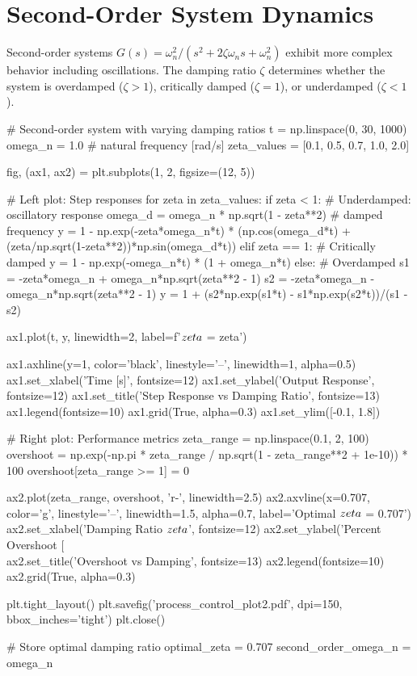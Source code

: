 \documentclass[11pt,a4paper]{article}
\begin{document}
\section{Second-Order System Dynamics}

Second-order systems $G(s) = \omega_n^2/(s^2 + 2\zeta\omega_n s + \omega_n^2)$ exhibit more complex behavior including oscillations. The damping ratio $\zeta$ determines whether the system is overdamped ($\zeta > 1$), critically damped ($\zeta = 1$), or underdamped ($\zeta < 1$).

\begin{pycode}
# Second-order system with varying damping ratios
t = np.linspace(0, 30, 1000)
omega_n = 1.0  # natural frequency [rad/s]
zeta_values = [0.1, 0.5, 0.7, 1.0, 2.0]

fig, (ax1, ax2) = plt.subplots(1, 2, figsize=(12, 5))

# Left plot: Step responses
for zeta in zeta_values:
    if zeta < 1:
        # Underdamped: oscillatory response
        omega_d = omega_n * np.sqrt(1 - zeta**2)  # damped frequency
        y = 1 - np.exp(-zeta*omega_n*t) * (np.cos(omega_d*t) + (zeta/np.sqrt(1-zeta**2))*np.sin(omega_d*t))
    elif zeta == 1:
        # Critically damped
        y = 1 - np.exp(-omega_n*t) * (1 + omega_n*t)
    else:
        # Overdamped
        s1 = -zeta*omega_n + omega_n*np.sqrt(zeta**2 - 1)
        s2 = -zeta*omega_n - omega_n*np.sqrt(zeta**2 - 1)
        y = 1 + (s2*np.exp(s1*t) - s1*np.exp(s2*t))/(s1 - s2)

    ax1.plot(t, y, linewidth=2, label=f'$\\zeta$ = {zeta}')

ax1.axhline(y=1, color='black', linestyle='--', linewidth=1, alpha=0.5)
ax1.set_xlabel('Time [s]', fontsize=12)
ax1.set_ylabel('Output Response', fontsize=12)
ax1.set_title('Step Response vs Damping Ratio', fontsize=13)
ax1.legend(fontsize=10)
ax1.grid(True, alpha=0.3)
ax1.set_ylim([-0.1, 1.8])

# Right plot: Performance metrics
zeta_range = np.linspace(0.1, 2, 100)
overshoot = np.exp(-np.pi * zeta_range / np.sqrt(1 - zeta_range**2 + 1e-10)) * 100
overshoot[zeta_range >= 1] = 0

ax2.plot(zeta_range, overshoot, 'r-', linewidth=2.5)
ax2.axvline(x=0.707, color='g', linestyle='--', linewidth=1.5, alpha=0.7, label='Optimal $\\zeta$ = 0.707')
ax2.set_xlabel('Damping Ratio $\\zeta$', fontsize=12)
ax2.set_ylabel('Percent Overshoot [\\%
ax2.set_title('Overshoot vs Damping', fontsize=13)
ax2.legend(fontsize=10)
ax2.grid(True, alpha=0.3)

plt.tight_layout()
plt.savefig('process_control_plot2.pdf', dpi=150, bbox_inches='tight')
plt.close()

# Store optimal damping ratio
optimal_zeta = 0.707
second_order_omega_n = omega_n
\end{pycode}
\end{document}
